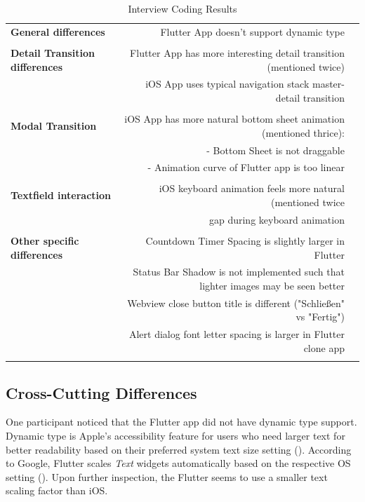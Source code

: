 \begin{table}[!htp]\centering
    \caption{Interview Coding Results}\label{tab:interview_coding_results}
    \scriptsize
    \begin{tabular}{lrr}\toprule
    \textbf{General differences} &Flutter App doesn't support dynamic type \\
    & \\
    \textbf{Detail Transition differences} &Flutter App has more interesting detail transition (mentioned twice) \\
    &iOS App uses typical navigation stack master-detail transition \\
    & \\
    \textbf{Modal Transition} &iOS App has more natural bottom sheet animation (mentioned thrice): \\
    &- Bottom Sheet is not draggable \\
    &- Animation curve of Flutter app is too linear \\
    \textbf{} & \\
    \textbf{Textfield interaction} &iOS keyboard animation feels more natural (mentioned twice \\
    &gap during keyboard animation \\
    & \\
    \textbf{Other specific differences} &Countdown Timer Spacing is slightly larger in Flutter \\
    &Status Bar Shadow is not implemented such that lighter images may be seen better \\
    &Webview close button title is different ("Schließen" vs "Fertig") \\
    &Alert dialog font letter spacing is larger in Flutter clone app \\
    & \\
    \bottomrule
    \end{tabular}
\end{table}

\subsection{Cross-Cutting Differences}
One participant noticed that the Flutter app did not have dynamic type support. 
Dynamic type is Apple's accessibility feature for users who need larger text for better readability based on their preferred system text size setting (\cite{Apple2021b}).
According to Google, Flutter scales \textit{Text} widgets automatically based on the respective OS setting (\cite{Google2021a}).
Upon further inspection, the Flutter seems to use a smaller text scaling factor than iOS.

